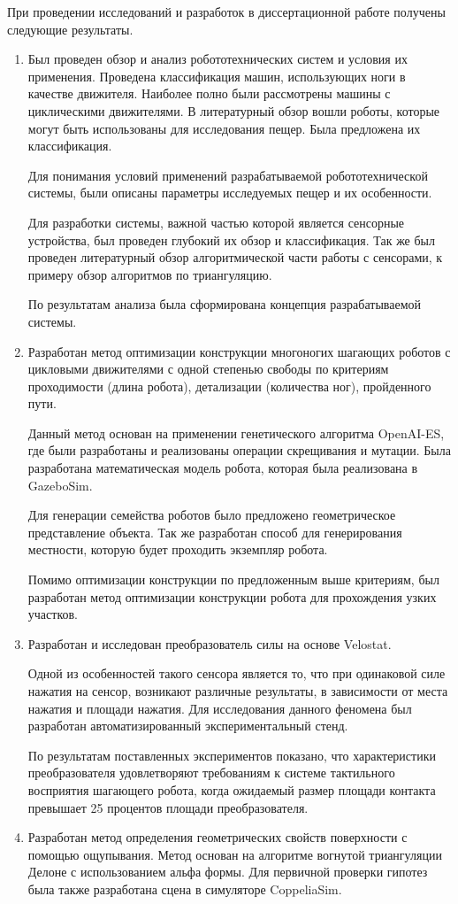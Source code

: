 При  проведении  исследований  и  разработок  в  диссертационной  работе  получены следующие результаты.
\begin{enumerate}
  \item Был проведен обзор и анализ робототехнических систем и условия их применения. Проведена классификация машин, использующих ноги в качестве движителя. Наиболее полно были рассмотрены машины с циклическими движителями. В литературный обзор вошли роботы, которые могут быть использованы для исследования пещер. Была предложена их классификация.

  Для понимания условий применений разрабатываемой робототехнической системы, были описаны параметры исследуемых пещер и их особенности.

  Для разработки системы, важной частью которой является сенсорные устройства, был проведен глубокий их обзор и классификация. Так же был проведен литературный обзор алгоритмической части работы с сенсорами, к примеру обзор алгоритмов по триангуляцию.

  По результатам анализа была сформирована концепция разрабатываемой системы.
  \item Разработан метод оптимизации конструкции многоногих шагающих роботов с цикловыми движителями с одной степенью свободы по критериям проходимости (длина робота), детализации (количества ног), пройденного пути.

  Данный метод основан на применении генетического алгоритма OpenAI-ES, где были разработаны и реализованы операции скрещивания и мутации. Была разработана математическая модель робота, которая была реализована в GazeboSim. 
  
  Для генерации семейства роботов было предложено геометрическое представление объекта. Так же разработан способ для генерирования местности, которую будет проходить экземпляр робота.

  Помимо оптимизации конструкции по предложенным выше критериям, был разработан метод оптимизации конструкции робота для прохождения узких участков.
  \item Разработан и исследован преобразователь силы на основе Velostat.

  Одной из особенностей такого сенсора является то, что при одинаковой силе нажатия на сенсор, возникают различные результаты, в зависимости от места нажатия и площади нажатия. Для исследования данного феномена был разработан автоматизированный экспериментальный стенд. 
  
  По результатам поставленных экспериментов показано, что характеристики преобразователя удовлетворяют требованиям к системе тактильного восприятия шагающего робота, когда ожидаемый размер площади контакта превышает 25 процентов площади преобразователя.
  \item Разработан метод определения геометрических свойств поверхности с помощью ощупывания. Метод основан на алгоритме вогнутой триангуляции Делоне с использованием альфа формы. Для первичной проверки гипотез была также разработана сцена в симуляторе CoppeliaSim.


\end{enumerate}
